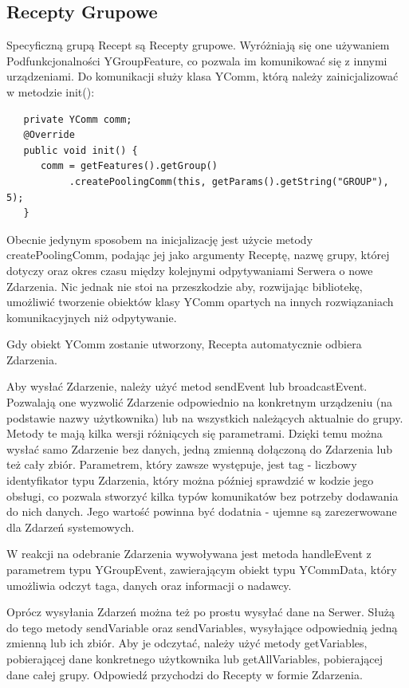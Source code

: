 \documentclass[11pt,a4paper,polish,thesis]{dcsbook}
\begin{document}
\subsection{Recepty Grupowe}
Specyficzną grupą Recept są Recepty grupowe. Wyróżniają się one używaniem Podfunkcjonalności YGroupFeature, co pozwala im komunikować się z innymi urządzeniami.
Do komunikacji służy klasa YComm, którą należy zainicjalizować w metodzie init():
\begin{verbatim}
   private YComm comm;
   @Override
   public void init() {
      comm = getFeatures().getGroup()
           .createPoolingComm(this, getParams().getString("GROUP"), 5);
   }
\end{verbatim}
Obecnie jedynym sposobem na inicjalizację jest użycie metody createPoolingComm, podając jej jako argumenty  Receptę, nazwę grupy, której dotyczy oraz okres czasu między kolejnymi odpytywaniami Serwera o nowe Zdarzenia. Nic jednak nie stoi na przeszkodzie aby, rozwijając bibliotekę, umożliwić tworzenie obiektów klasy YComm opartych na innych rozwiązaniach komunikacyjnych niż odpytywanie. 

Gdy obiekt YComm zostanie utworzony, Recepta automatycznie odbiera Zdarzenia.

Aby wysłać Zdarzenie, należy użyć metod sendEvent lub broadcastEvent. Pozwalają one wyzwolić Zdarzenie odpowiednio na konkretnym urządzeniu (na podstawie nazwy użytkownika) lub na wszystkich należących aktualnie do grupy. Metody te mają kilka wersji różniących się parametrami. Dzięki temu można wysłać samo Zdarzenie bez danych, jedną zmienną dołączoną do Zdarzenia lub też cały zbiór. Parametrem, który zawsze występuje, jest tag - liczbowy identyfikator typu Zdarzenia, który można później sprawdzić w kodzie jego obsługi, co pozwala stworzyć kilka typów komunikatów bez potrzeby dodawania do nich danych. Jego wartość powinna być dodatnia - ujemne są zarezerwowane dla Zdarzeń systemowych.

W reakcji na odebranie Zdarzenia wywoływana jest metoda handleEvent z parametrem typu YGroupEvent, zawierającym obiekt typu YCommData, który umożliwia odczyt taga, danych oraz informacji o nadawcy.

Oprócz wysyłania Zdarzeń można też po prostu wysyłać dane na Serwer. Służą do tego metody sendVariable oraz sendVariables, wysyłające odpowiednią jedną zmienną lub ich zbiór. Aby je odczytać, należy użyć metody getVariables, pobierającej dane konkretnego użytkownika lub getAllVariables, pobierającej dane całej grupy. Odpowiedź przychodzi do Recepty w formie Zdarzenia.
\end{document}
